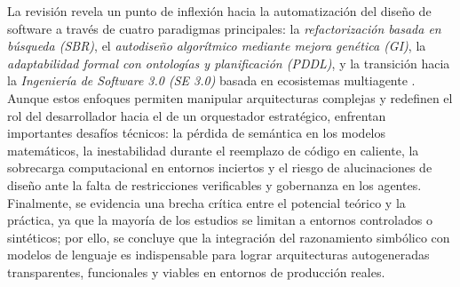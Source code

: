 \documentclass[12pt, letterpaper, oneside]{book}
\begin{document}
La revisión revela un punto de inflexión hacia la automatización del diseño de software a través de cuatro paradigmas principales: la \textit{refactorización basada en búsqueda (SBR)}, el \textit{autodiseño algorítmico mediante mejora genética (GI)}, la \textit{adaptabilidad formal con ontologías y planificación (PDDL)}, y la transición hacia la \textit{Ingeniería de Software 3.0 (SE 3.0)} basada en ecosistemas multiagente \cite{li2025riseaiteammatessoftware}. Aunque estos enfoques permiten manipular arquitecturas complejas y redefinen el rol del desarrollador hacia el de un orquestador estratégico, enfrentan importantes desafíos técnicos: la pérdida de semántica en los modelos matemáticos, la inestabilidad durante el reemplazo de código en caliente, la sobrecarga computacional en entornos inciertos y el riesgo de alucinaciones de diseño ante la falta de restricciones verificables y gobernanza en los agentes. Finalmente, se evidencia una brecha crítica entre el potencial teórico y la práctica, ya que la mayoría de los estudios se limitan a entornos controlados o sintéticos; por ello, se concluye que la integración del razonamiento simbólico con modelos de lenguaje es indispensable para lograr arquitecturas autogeneradas transparentes, funcionales y viables en entornos de producción reales.
\end{document}
